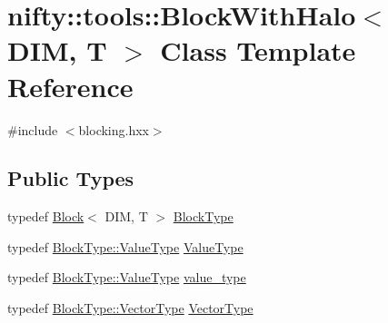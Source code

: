 \hypertarget{classnifty_1_1tools_1_1BlockWithHalo}{}\section{nifty\+:\+:tools\+:\+:Block\+With\+Halo$<$ D\+I\+M, T $>$ Class Template Reference}
\label{classnifty_1_1tools_1_1BlockWithHalo}


{\ttfamily \#include $<$blocking.\+hxx$>$}

\subsection*{Public Types}
\begin{DoxyCompactItemize}
\item 
typedef \hyperlink{classnifty_1_1tools_1_1Block}{Block}$<$ D\+I\+M, T $>$ \hyperlink{classnifty_1_1tools_1_1BlockWithHalo_a98d2c04518f8902ab6d985feba605987}{Block\+Type}
\item 
typedef \hyperlink{classnifty_1_1tools_1_1Block_a3e77342701a32fcc670d398f1b9bc6d4}{Block\+Type\+::\+Value\+Type} \hyperlink{classnifty_1_1tools_1_1BlockWithHalo_a65d120db84dfca7586ae5ab30f26f01b}{Value\+Type}
\item 
typedef \hyperlink{classnifty_1_1tools_1_1Block_a3e77342701a32fcc670d398f1b9bc6d4}{Block\+Type\+::\+Value\+Type} \hyperlink{classnifty_1_1tools_1_1BlockWithHalo_a2b9bb6388ec694b2e1f13399be84356d}{value\+\_\+type}
\item 
typedef \hyperlink{classnifty_1_1tools_1_1Block_aa077b4ebbf3e4e9b679d1957ca10ba32}{Block\+Type\+::\+Vector\+Type} \hyperlink{classnifty_1_1tools_1_1BlockWithHalo_a040d8a654eb42791c6e5fbd4dfd51b9f}{Vector\+Type}
\end{DoxyCompactItemize}
